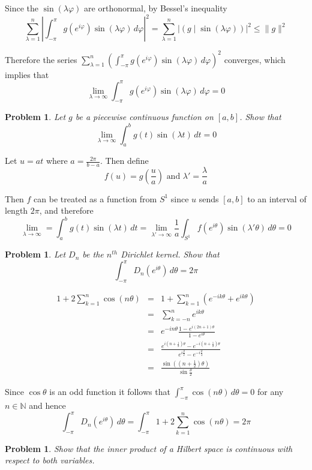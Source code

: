 \documentclass[letterpaper,11pt]{article}
\newtheorem{problem}[theorem]{Problem}
\newcommand{\N}{\mathbb{N}}
\newcommand{\ip}[2]{\left(#1\mid#2\right)}
\begin{document}
Since the $\sin(\lambda\varphi)$ are orthonormal, by Bessel's inequality
\[
\sum_{\lambda=1}^n \left|\int_{-\pi}^{\pi} g(e^{i\varphi}) \sin(\lambda\varphi) \,d\varphi\right|^2 = \sum_{\lambda=1}^n |\ip{g}{\sin(\lambda\varphi)}|^2 \leq \|g\|^2
\]

Therefore the series $\sum_{\lambda=1}^n \left(\int_{-\pi}^{\pi} g(e^{i\varphi}) \sin(\lambda\varphi) \,d\varphi\right)^2$ converges, which implies that
\[
\lim_{\lambda \rightarrow \infty} \int_{-\pi}^{\pi} g(e^{i\varphi}) \sin(\lambda\varphi) \,d\varphi = 0
\]
\begin{problem}
Let $g$ be a piecewise continuous function on $[a,b]$.  Show that
\[
\lim_{\lambda \rightarrow \infty} \int_a^b g(t) \sin(\lambda t) \,dt = 0
\]
\end{problem}

Let $u = at$ where $a = \frac{2\pi}{b-a}$.  Then define
\[
f(u) = g\left(\frac{u}{a}\right) \mbox{ and } \lambda' = \frac{\lambda}{a}
\]

Then $f$ can be treated as a function from $S^1$ since $u$ sends $[a,b]$ to an interval of length $2\pi$, and therefore
\[
\lim_{\lambda \rightarrow \infty} = \int_a^b g(t) \sin(\lambda t) \,dt = \lim_{\lambda' \rightarrow \infty}\frac{1}{a} \int_{S^1} f(e^{i\theta})\sin(\lambda'\theta) \,d\theta= 0
\]
\begin{problem}
Let $D_n$ be the $n^{th}$ Dirichlet kernel.  Show that
\[
\int_{-\pi}^{\pi} D_n(e^{i\theta}) \,d\theta = 2\pi
\]
\end{problem}

\begin{eqnarray*}
1 + 2\sum_{k=1}^n \cos(n\theta) &=& 1 + \sum_{k=1}^n \left(e^{-ik\theta} + e^{ik\theta}\right) \\
&=& \sum_{k=-n}^n e^{ik\theta} \\
&=& e^{-in\theta}\frac{1-e^{i(2n+1)\theta}}{1-e^{i\theta}} \\
&=&\frac{e^{i\left(n+\frac{1}{2}\right)\theta}-e^{-i\left(n+\frac{1}{2}\right)\theta}} {e^{i\frac{\theta}{2}}-e^{-i\frac{\theta}{2}}}\\
&=&\frac{\sin\left(\left(n+\frac{1}{2}\right)\theta\right)}{\sin\frac{\theta}{2}}
\end{eqnarray*}

Since $\cos\theta$ is an odd function it follows that $\int_{-\pi}^{\pi} \cos(n\theta) \,d\theta = 0$ for any $n \in \N$ and hence
\[
\int_{-\pi}^{\pi} D_n(e^{i\theta}) \,d\theta = \int_{-\pi}^{\pi} 1 + 2\sum_{k=1}^n \cos(n\theta) = 2\pi
\]
\begin{problem}
Show that the inner product of a Hilbert space is continuous with respect to both variables.
\end{problem}
\end{document}
